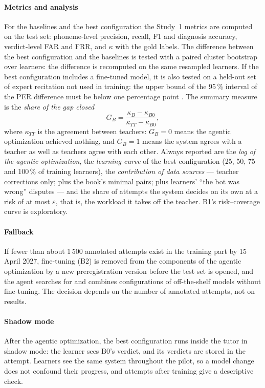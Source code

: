 \paragraph{Metrics and analysis} For the baselines and the best configuration the Study~1 metrics are computed
on the test set: phoneme-level precision, recall, F1 and diagnosis accuracy, verdict-level FAR and FRR, and
$\kappa$ with the gold labels. The difference between the best configuration and the baselines is tested with a
paired cluster bootstrap over learners: the difference is recomputed on the same resampled learners. If the best
configuration includes a fine-tuned model, it is also tested on a held-out set of expert recitation not used in
training: the upper bound of the 95\,\% interval of the PER difference must be below
one percentage point \cite{SRC-118}. The summary measure is the \emph{share of the gap closed}
\begin{equation}
  G_B = \frac{\kappa_B - \kappa_{B0}}{\kappa_{TT} - \kappa_{B0}},
\end{equation}
where $\kappa_{TT}$ is the agreement between teachers: $G_B=0$ means the agentic optimization achieved nothing, and
$G_B=1$ means the system agrees with a teacher as well as teachers agree with each other. Always reported are
the \emph{log of the agentic optimization}, the \emph{learning curve} of the best configuration (25, 50, 75 and 100\,\% of training learners), the \emph{contribution of
data sources} --- teacher corrections only; plus the book's minimal pairs; plus learners' ``the bot was wrong''
disputes --- and the share of attempts the system decides on its own at a risk of at most $\varepsilon$, that
is, the workload it takes off the teacher. B1's risk--coverage curve is exploratory.

\paragraph{Fallback} If fewer than about 1\,500 annotated attempts exist in the training part by 15 April
2027, fine-tuning (B2) is removed from the components of the agentic optimization by a new preregistration version before
the test set is opened, and the agent searches for and combines configurations of off-the-shelf models without fine-tuning. The decision depends on the number of annotated
attempts, not on results.

\paragraph{Shadow mode} After the agentic optimization, the best configuration runs inside the tutor in shadow mode: the
learner sees B0's verdict, and its verdicts are stored in the attempt. Learners see the same system throughout
the pilot, so a model change does not confound their progress, and attempts after training give a
descriptive check.

